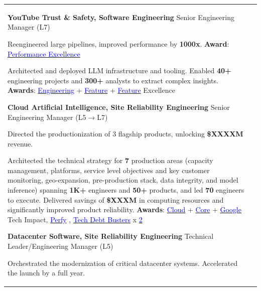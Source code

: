 \documentclass[letterpaper,10pt,oneside]{article}
\newcommand{\itemspacing}{\vspace{0.12cm}}
\newcommand{\sref}[2]{%
    \href{https://0/local/attachments/#1}{\textcolor{blue}{#2}}%
}
\newenvironment{body}
{\par\par
\begin{longtable}{p{0.145\textwidth}p{0.81\textwidth}}
\endfirsthead
\noalign{\vspace{0.4cm}}
\endhead}
{\par\end{longtable}\par}
\begin{document}
\begin{body}
\phantom{g}\textbf{YouTube Trust \& Safety, Software Engineering} \textemdash{ }Senior Engineering Manager (L7)
\begin{comp}
\item Reengineered large pipelines, improved performance by \textbf{1000x}. \textbf{Award}: \sref{Google-Award-PerformanceExcellence.pdf}{Performance Excellence}
\item Architected and deployed LLM infrastructure and tooling. Enabled \textbf{40+} engineering projects and \textbf{300+} analysts to extract complex insights. \textbf{Awards}: \sref{Award-EngineeringExcellenceImpact.pdf}{Engineering} + \sref{Google-Award-FeatureExcellence.pdf}{Feature} + \sref{Google-Award-FeatureExcellence2.pdf}{Feature} Excellence
\end{comp}
\itemspacing

\phantom{g}\textbf{Cloud Artificial Intelligence, Site Reliability Engineering} \textemdash{ }Senior Engineering Manager (L5$\rightarrow$L7)
\begin{comp}
\item Directed the productionization of 3 flagship products, unlocking \textbf{\$XXXXM} revenue.
\item Architected the technical strategy for \textbf{7} production areas (capacity management, platforms, service level objectives and key customer monitoring, geo-expansion, pre-production stack, data integrity, and model inference) spanning \textbf{1K+} engineers and \textbf{50+} products, and led \textbf{70} engineers to execute. Delivered savings of \textbf{\$XXXM} in computing resources and significantly improved product reliability. \newline\textbf{Awards}: \sref{Google-Award-GoogleCloudTechImpact-2022.pdf}{Cloud} + \sref{Google-Award-CoreTechImpact-2021.pdf}{Core} + \sref{Google-Award-GoogleTechImpact-2022.pdf}{Google} Tech Impact, \sref{Google-Award-Perfy.pdf}{Perfy}, \sref{Google-Award-TechDebtBusters1.pdf}{Tech Debt Busters} x\sref{Google-Award-TechDebtBusters2.pdf}{2}
\end{comp}
\itemspacing

\phantom{g}\textbf{Datacenter Software, Site Reliability Engineering} \textemdash{ }Technical Leader/Engineering Manager (L5)
\begin{comp}
\item Orchestrated the modernization of critical datacenter systems. Accelerated the launch by a full year.
\end{comp}
\itemspacing


\end{body}
\end{document}
